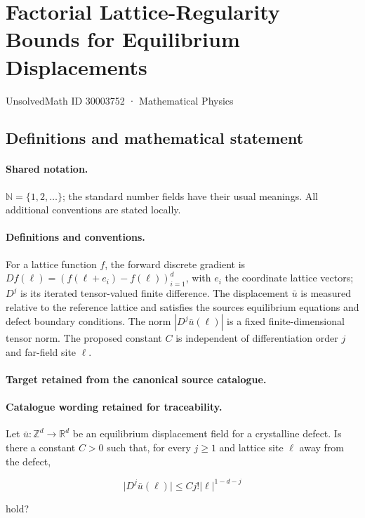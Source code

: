 \documentclass[11pt]{article}
\begin{document}
\setcounter{section}{30003751}
\section{Factorial Lattice-Regularity Bounds for Equilibrium Displacements}\label{30003752}
{\small UnsolvedMath ID 30003752 · Mathematical Physics}
\subsection{Definitions and mathematical statement}

\paragraph{Shared notation.}$\mathbb N=\{1,2,\ldots\}$; the standard number fields have their usual meanings. All additional conventions are stated locally.


\paragraph{Definitions and conventions.}
For a lattice function $f$, the forward discrete gradient is $Df(\ell)=(f(\ell+e_i)-f(\ell))_{i=1}^d$, with $e_i$ the coordinate lattice vectors; $D^j$ is its iterated tensor-valued finite difference. The displacement $\bar u$ is measured relative to the reference lattice and satisfies the source\textquotesingle s equilibrium equations and defect boundary conditions. The norm $|D^j\bar u(\ell)|$ is a fixed finite-dimensional tensor norm. The proposed constant $C$ is independent of differentiation order $j$ and far-field site $\ell$.

\paragraph{Target retained from the canonical source catalogue.}
\paragraph{Catalogue wording retained for traceability.}
Let $\bar u:\mathbb Z^d\to\mathbb R^d$ be an equilibrium displacement field for a crystalline defect. Is there a constant $C>0$ such that, for every $j\geq1$ and lattice site $\ell$ away from the defect,

$$\lvert D^j\bar u(\ell)\rvert\leq Cj!\lvert\ell\rvert^{1-d-j}$$

hold?
\end{document}
